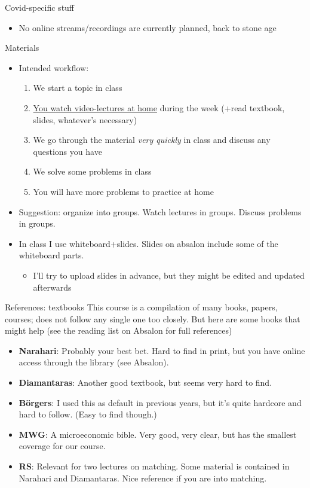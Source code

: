 \documentclass[english,10pt
,aspectratio=169
]{beamer}
\begin{document}
\begin{frame}{Covid-specific stuff}
	\begin{itemize}
		\item No online streams/recordings are currently planned, back to stone age
	\end{itemize}
\end{frame}


\begin{frame}{Materials}
	\begin{itemize}
		\item Intended workflow: 
		\begin{enumerate}
			\item We start a topic in class
			\item \uline{You watch video-lectures at home} during the week (+read textbook, slides, whatever's necessary)
			\item We go through the material \emph{very quickly} in class and discuss any questions you have
			\item We solve some problems in class
			\item You will have more problems to practice at home
		\end{enumerate}
		\pause
		\item Suggestion: organize into groups. Watch lectures in groups. Discuss problems in groups.
		\pause
		\item In class I use whiteboard+slides. Slides on absalon include some of the whiteboard parts.
		\begin{itemize}
			\item I'll try to upload slides in advance, but they might be edited and updated afterwards
		\end{itemize}
	\end{itemize}
\end{frame}


\begin{frame}{References: textbooks}
	This course is a compilation of many books, papers, courses; does not follow any single one too closely. But here are some books that might help (see the reading list on Absalon for full references)
	\begin{itemize}%
		\item \textbf{Narahari}: Probably your best bet. Hard to find in print, but you have online access through the library (see Absalon).
		\item \textbf{Diamantaras}: Another good textbook, but seems very hard to find.
		\item \textbf{B\"{o}rgers}: I used this as default in previous years, but it's quite hardcore and hard to follow. (Easy to find though.)
		\item \textbf{MWG}: A microeconomic bible. Very good, very clear, but has the smallest coverage for our course.
		\item \textbf{RS}: Relevant for two lectures on matching. Some material is contained in Narahari and Diamantaras. Nice reference if you are into matching.
	\end{itemize}
\end{frame}
\end{document}
